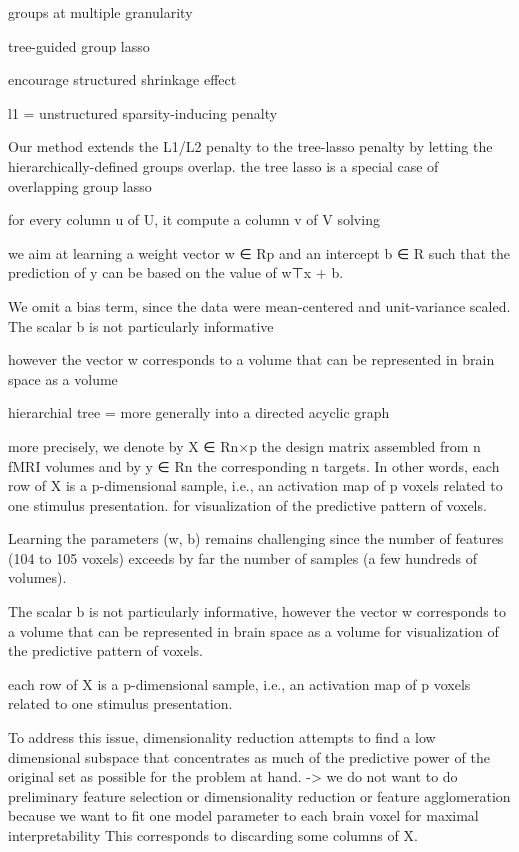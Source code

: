 \documentclass{article} %
\begin{document}
groups at multiple granularity

tree-guided group lasso

encourage structured shrinkage effect 

l1 = unstructured sparsity-inducing penalty

Our method extends the L1/L2 penalty to the tree-lasso penalty
by letting the hierarchically-defined groups overlap. 
the tree lasso is a special case of overlapping group lasso

for every column u of U, it compute a column v of V solving

we aim at learning a weight vector w ∈ Rp and an intercept b ∈ R
such that the prediction of y can be based on the value of w⊤x + b.

We omit a bias term, since the data were mean-centered
and unit-variance scaled.
The scalar b is not particularly informative

however the vector w corresponds to a volume that
can be represented in brain space as a volume

hierarchial tree = more generally into a directed acyclic graph

more precisely, we denote by X ∈ Rn×p the design matrix
assembled from n fMRI volumes and by y ∈ Rn the corresponding n targets.
In other words, each row of X is a p-dimensional sample,
i.e., an activation map of p voxels related to one stimulus presentation.
for visualization of the predictive pattern of voxels. 

Learning the parameters (w, b) remains challenging
since the number of features (104 to 105 voxels) exceeds
by far the number of samples (a few hundreds of volumes). 

The scalar b is not particularly informative,
however the vector w corresponds to a volume that
can be represented in brain space as a volume
for visualization of the predictive pattern of voxels.

each row of X is a p-dimensional sample,
i.e., an activation map of p voxels related to one stimulus presentation.

To address this issue, dimensionality reduction attempts to
find a low dimensional subspace that concentrates
as much of the predictive power of
the original set as possible for the problem at hand.
-> we do not want to do preliminary feature selection or
dimensionality reduction
or feature agglomeration because we want to fit one model parameter
to each brain voxel for maximal interpretability
This corresponds to discarding some columns of X.
\end{document}
